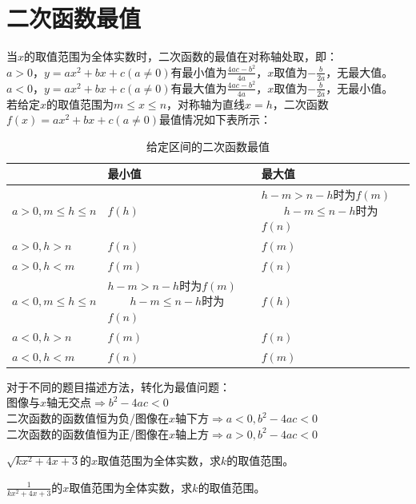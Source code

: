 \documentclass{ecnuthesis}
\begin{document}
\section{二次函数最值}
\begin{knowledge}
    当$x$的取值范围为全体实数时，二次函数的最值在对称轴处取，即：\\
    $a>0$，$y=ax^2+bx+c(a\ne 0)$有最小值为$\frac{4ac-b^2}{4a}$，$x$取值为$-\frac{b}{2a}$，无最大值。\\
    $a<0$，$y=ax^2+bx+c(a\ne 0)$有最大值为$\frac{4ac-b^2}{4a}$，$x$取值为$-\frac{b}{2a}$，无最小值。 \\
    若给定$x$的取值范围为$m \le x \le n$，对称轴为直线$x=h$，二次函数$f(x)=ax^2+bx+c(a\ne 0)$最值情况如下表所示：
\end{knowledge}
\begin{table}[H]
\centering
\caption{给定区间的二次函数最值}
\begin{tabular}{l|p{5cm}|p{5cm}}
\hline
\hline
 & 最小值 & 最大值 \\
\hline
$a>0, m \le h \le n$ & $f(h)$ & $h-m>n-h$时为$f(m)$ $\qquad h-m\le n-h$时为$f(n)$ \\
$a>0, h > n$ & $f(n)$ & $f(m)$ \\
$a>0, h < m$ & $f(m)$ & $f(n)$ \\
$a<0, m \le h \le n$ & $h-m>n-h$时为$f(m)$ $\qquad h-m\le n-h$时为$f(n)$ & $f(h)$ \\
$a<0, h > n$ & $f(m)$ & $f(n)$ \\
$a<0, h < m$ & $f(n)$ & $f(m)$ \\
\hline
\hline
\end{tabular}
\end{table}
\begin{knowledge}
    对于不同的题目描述方法，转化为最值问题：\\
    图像与$x$轴无交点$\Rightarrow b^2-4ac<0$ \\
    二次函数的函数值恒为负/图像在$x$轴下方$\Rightarrow a<0, b^2-4ac < 0$ \\
    二次函数的函数值恒为正/图像在$x$轴上方$\Rightarrow a>0, b^2-4ac < 0$
\end{knowledge}
\begin{problem}
    $\sqrt{kx^2+4x+3}$的$x$取值范围为全体实数，求$k$的取值范围。
\end{problem}
\begin{problem}
    $\frac{1}{kx^2+4x+3}$的$x$取值范围为全体实数，求$k$的取值范围。
\end{problem}
\clearpage
\end{document}
